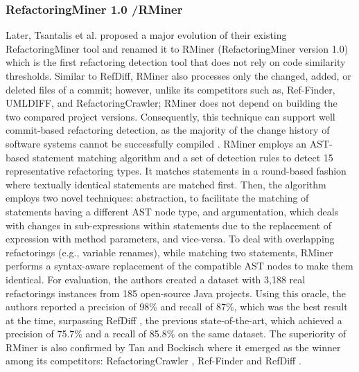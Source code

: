 \documentclass[letterpaper,12pt,onecolumn,final]{report}
\begin{document}
\subsubsection{RefactoringMiner 1.0 /RMiner}
Later, Tsantalis et al. \cite{Tsantalis2018} proposed a major evolution of their existing RefactoringMiner \cite{Silva2016} \cite{Tsantalis2013} tool and renamed it to RMiner (RefactoringMiner version 1.0) which is the first refactoring detection tool that does not rely on code similarity thresholds. Similar to RefDiff, RMiner also processes only the changed, added, or deleted files of a commit; however, unlike its competitors such as, Ref-Finder, UMLDIFF, and RefactoringCrawler; RMiner does not depend on building the two compared project versions. Consequently, this technique can support well commit-based refactoring detection, as the majority of the change history of software systems cannot be successfully compiled \cite{Tufano2017}. RMiner employs an AST-based statement matching algorithm and a set of detection rules to detect 15 representative refactoring types. It matches statements in a round-based fashion where textually identical statements are matched first. Then, the algorithm employs two novel techniques: abstraction, to facilitate the matching of statements having a different AST node type, and argumentation, which deals with changes in sub-expressions within statements due to the replacement of expression with method parameters, and vice-versa. To deal with overlapping refactorings (e.g., variable renames), while matching two statements, RMiner performs a syntax-aware replacement of the compatible AST nodes to make them identical. For evaluation, the authors created a dataset with 3,188 real refactorings instances from 185 open-source Java projects. Using this oracle, the authors reported a precision of 98\% and recall of 87\%, which was the best result at the time, surpassing RefDiff \cite{Silva2017}, the previous state-of-the-art, which achieved a precision of 75.7\% and a recall of 85.8\% on the same dataset. The superiority of RMiner is also confirmed by Tan and Bockisch \cite{Tan2019} where it emerged as the winner among its competitors: RefactoringCrawler \cite{Dig2006}, Ref-Finder \cite{Prete2010} and RefDiff \cite{Silva2017}.
\end{document}
